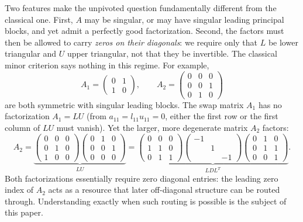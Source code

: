 Two features make the unpivoted question fundamentally different from the
classical one.  First, $A$ may be singular, or may have singular leading
principal blocks, and yet admit a perfectly good factorization.  Second, the
factors must then be allowed to carry \emph{zeros on their diagonals}: we
require only that $L$ be lower triangular and $U$ upper triangular, not that
they be invertible.  The classical minor criterion says nothing in this
regime.  For example,
\begin{equation}\label{eq:swap-vs-exchange}
  A_1 =
  \begin{pmatrix}
    0 & 1\\
    1 & 0
  \end{pmatrix},
  \qquad
  A_2 =
  \begin{pmatrix}
    0 & 0 & 0\\
    0 & 0 & 1\\
    0 & 1 & 0
  \end{pmatrix}
\end{equation}
are both symmetric with singular leading blocks.  The swap matrix $A_1$ has
no factorization $A_1 = LU$ (from $a_{11} = l_{11}u_{11} = 0$, either the
first row or the first column of $LU$ must vanish).  Yet the larger, more
degenerate matrix $A_2$ factors:
\begin{equation}\label{eq:exchange-factorizations}
  A_2 =
  \underbrace{\begin{pmatrix} 0 & 0 & 0\\ 0 & 1 & 0\\ 1 & 0 & 0 \end{pmatrix}
  \begin{pmatrix} 0 & 1 & 0\\ 0 & 0 & 1\\ 0 & 0 & 0 \end{pmatrix}}_{LU}
  =
  \underbrace{\begin{pmatrix} 0 & 0 & 0\\ 1 & 1 & 0\\ 0 & 1 & 1 \end{pmatrix}
  \begin{pmatrix} -1 & & \\ & 1 & \\ & & -1 \end{pmatrix}
  \begin{pmatrix} 0 & 1 & 0\\ 0 & 1 & 1\\ 0 & 0 & 1 \end{pmatrix}}_{LDL^T} .
\end{equation}
Both factorizations essentially require zero diagonal entries: the leading
zero index of $A_2$ acts as a resource that later off-diagonal structure can
be routed through.  Understanding exactly when such routing is possible is
the subject of this paper.

